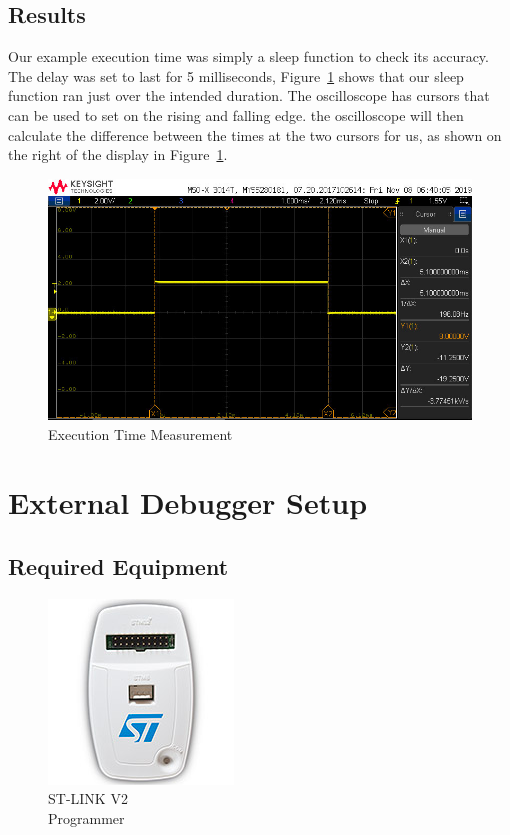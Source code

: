 \documentclass{article}
\begin{document}
  \subsection{Results}

  Our example execution time was simply a sleep function to check its accuracy.
  The delay was set to last for 5 milliseconds,
  Figure~\ref{fig:exectime_measure} shows that our sleep function ran just over
  the intended duration. The oscilloscope has cursors that can be used to set on
  the rising and falling edge. the oscilloscope will then calculate the
  difference between the times at the two cursors for us, as shown on the right
  of the display in Figure~\ref{fig:exectime_measure}.

  \begin{figure}[h]
    \includegraphics[width=\textwidth]{images/exec_time/exec_time.jpg}
    \caption{Execution Time Measurement}
    \label{fig:exectime_measure}
  \end{figure}

  \section{External Debugger Setup}

  \subsection{Required Equipment}

  \begin{figure}
    \includegraphics[width=30ex]{images/programming/stlinkv2.jpg}
    \caption{ST-LINK V2 \\ Programmer}
  \end{figure}
\end{document}
